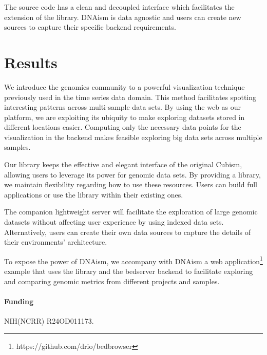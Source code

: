 \documentclass{bioinfo}
\begin{document}
The source code has a clean and decoupled interface which facilitates the
extension of the library. DNAism is data agnostic and users can create new
sources to capture their specific backend requirements.

\section{Results}

We introduce the genomics community to a powerful visualization technique
previously used in the time series data domain. This method facilitates
spotting interesting patterns across multi-sample data sets. By using the web
as our platform, we are exploiting its ubiquity to make exploring datasets
stored in different locations easier.  Computing only the necessary data points
for the visualization in the backend makes feasible exploring big data sets
across multiple samples.

Our library keeps the effective and elegant interface of the original Cubism,
allowing users to leverage its power for genomic data sets. By providing a
library, we maintain flexibility regarding how to use these resources. Users
can build full applications or use the library within their existing ones.

The companion lightweight server will facilitate the exploration of large
genomic datasets without affecting user experience by using indexed data sets.
Alternatively, users can create their own data sources to capture the details
of their environments' architecture.

To expose the power of DNAism, we accompany with DNAism a web
application\footnote{https://github.com/drio/bedbrowser} example that uses the
library and the bedserver backend to facilitate exploring and comparing genomic
metrics from different projects and samples.




\paragraph{Funding\textcolon} NIH(NCRR) R24OD011173.


\end{document}
